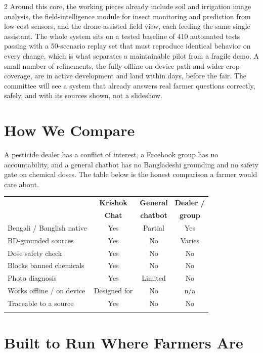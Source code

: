 \documentclass[11pt]{article}
\begin{document}
\begin{multicols}{2}
Around this core, the working pieces already include soil and irrigation image analysis, the field-intelligence module for insect monitoring and prediction from low-cost sensors, and the drone-assisted field view, each feeding the same single assistant. The whole system sits on a tested baseline of 410 automated tests passing with a 50-scenario replay set that must reproduce identical behavior on every change, which is what separates a maintainable pilot from a fragile demo. A small number of refinements, the fully offline on-device path and wider crop coverage, are in active development and land within days, before the fair. The committee will see a system that already answers real farmer questions correctly, safely, and with its sources shown, not a slideshow.

\section{How We Compare}

A pesticide dealer has a conflict of interest, a Facebook group has no accountability, and a general chatbot has no Bangladeshi grounding and no safety gate on chemical doses. The table below is the honest comparison a farmer would care about.

\begin{center}
\small
\begin{tabular}{@{}>{\raggedright\arraybackslash}p{2.5cm} c c c@{}}
\arrayrulecolor{brandgreen}\toprule
 & \textbf{Krishok} & \textbf{General} & \textbf{Dealer /} \\
 & \textbf{Chat} & \textbf{chatbot} & \textbf{group} \\
\midrule
Bengali / Banglish native & Yes & Partial & Yes \\
BD-grounded sources & Yes & No & Varies \\
Dose safety check & Yes & No & No \\
Blocks banned chemicals & Yes & No & No \\
Photo diagnosis & Yes & Limited & No \\
Works offline / on device & Designed for & No & n/a \\
Traceable to a source & Yes & No & No \\
\arrayrulecolor{brandgreen}\bottomrule
\end{tabular}
\end{center}

\section{Built to Run Where Farmers Are}


\end{multicols}
\end{document}
